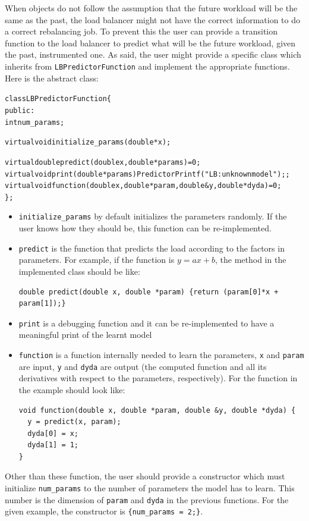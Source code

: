 When objects do not follow the assumption that the future workload will be the
same as the past, the load balancer might not have the correct information to do
a correct rebalancing job. To prevent this the user can provide a transition
function to the load balancer to predict what will be the future workload, given
the past, instrumented one. As said, the user might provide a specific class
which inherits from {\tt LBPredictorFunction} and implement the appropriate functions. 
Here is the abstract class:
\begin{alltt}
class LBPredictorFunction \{
public:
  int num_params;
 
  virtual void initialize_params(double *x);

  virtual double predict(double x, double *params) =0;
  virtual void print(double *params) {PredictorPrintf("LB: unknown model");};
  virtual void function(double x, double *param, double &y, double *dyda) =0;
\};
\end{alltt}
\begin{itemize}
\item {\tt initialize\_params} by default initializes the parameters randomly. If the user
knows how they should be, this function can be re-implemented.
\item {\tt predict} is the function that predicts the load according to the factors in parameters.
For example, if the function is
$y=ax+b$, the method in the implemented class should be like:
\begin{verbatim}
double predict(double x, double *param) {return (param[0]*x + param[1]);}
\end{verbatim}
\item {\tt print} is a debugging function and it can be re-implemented to have a meaningful
print of the learnt model
\item {\tt function} is a function internally needed to learn the parameters, {\tt x} and
{\tt param} are input, {\tt y} and {\tt dyda} are output (the computed function and
all its derivatives with respect to the parameters, respectively).
For the function in the example should look like:
\begin{verbatim}
void function(double x, double *param, double &y, double *dyda) {
  y = predict(x, param);
  dyda[0] = x;
  dyda[1] = 1;
}
\end{verbatim}
\end{itemize}
Other than these function, the user should provide a constructor which must initialize
{\tt num\_params} to the number of parameters the model has to learn. This number is
the dimension of {\tt param} and {\tt dyda} in the previous functions. For the given
example, the constructor is {\tt \{num\_params = 2;\}}.


